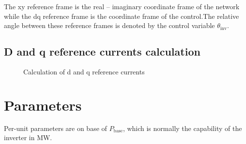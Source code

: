\documentclass[
  a4paper,
  DIV=11,
  numbers=noendperiod]{scrartcl}
\begin{document}
\begin{tcolorbox}[enhanced jigsaw, colback=white, toprule=.15mm, leftrule=.75mm, colbacktitle=quarto-callout-note-color!10!white, colframe=quarto-callout-note-color-frame, breakable, opacityback=0, bottomrule=.15mm, opacitybacktitle=0.6, left=2mm, rightrule=.15mm, titlerule=0mm, bottomtitle=1mm, toptitle=1mm, coltitle=black, arc=.35mm, title=\textcolor{quarto-callout-note-color}{\faInfo}\hspace{0.5em}{Note}]

The xy reference frame is the real -- imaginary coordinate frame of the
network while the dq reference frame is the coordinate frame of the
control.The relative angle between these reference frames is denoted by
the control variable \(\theta_\mathrm{inv}\).

\end{tcolorbox}

\subsection{D and q reference currents
calculation}\label{d-and-q-reference-currents-calculation}

\begin{figure}


\caption{\label{fig-IdIqRefCalculation}Calculation of d and q reference
currents}

\end{figure}%

\section{Parameters}\label{parameters}

Per-unit parameters are on base of \(P_\mathrm{base}\), which is
normally the capability of the inverter in MW.
\end{document}
